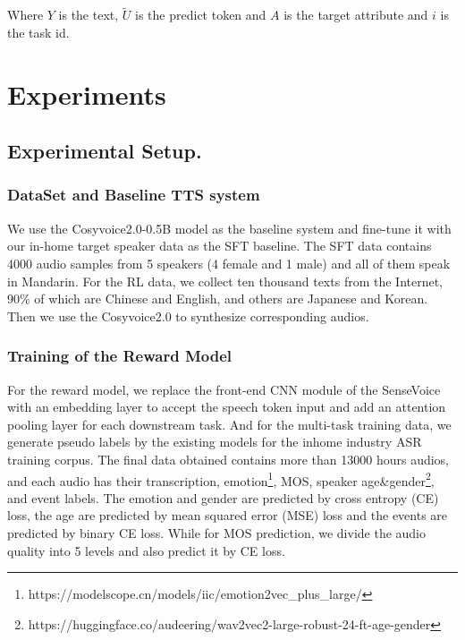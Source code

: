 \documentclass[a4paper]{article}
\begin{document}
Where $Y$ is the text, $\tilde{U}$ is the predict token and $A$ is the target attribute and $i$ is the task id. 


\section{Experiments}
\label{S:4}
\subsection{Experimental Setup.}
\subsubsection{DataSet and Baseline TTS system} 
We use the Cosyvoice2.0-0.5B \cite{du2024cosyvoice2scalablestreaming} model as the baseline system and fine-tune it with our in-home target speaker data as the SFT baseline. The SFT data contains 4000 audio samples from 5 speakers (4 female and 1 male) and all of them speak in Mandarin.
For the RL data, we collect ten thousand texts from the Internet, 90\% of which are Chinese and English, and others are Japanese and Korean. Then we use the Cosyvoice2.0 to synthesize corresponding audios.

\subsubsection{Training of the Reward Model}

For the reward model, we replace the front-end CNN module of the SenseVoice with an embedding layer to accept the speech token input and add an attention pooling layer for each downstream task. 
And for the multi-task training data, we generate pseudo labels by the existing models for the inhome industry ASR training corpus. The final data obtained contains more than 13000 hours audios, and each audio has their transcription, emotion\footnote{https://modelscope.cn/models/iic/emotion2vec\_plus\_large/}, 
MOS\cite{Kumar2023TorchaudioSquimRS}, 
speaker age\&gender\footnote{https://huggingface.co/audeering/wav2vec2-large-robust-24-ft-age-gender}, and event labels\cite{Kong2019PANNsLP}. 
The emotion and gender are predicted by cross entropy (CE) loss, the age are predicted by mean squared error (MSE) loss and the events are predicted by binary CE loss. While for MOS prediction, we divide the audio quality into 5 levels and also predict it by CE loss.
\end{document}
